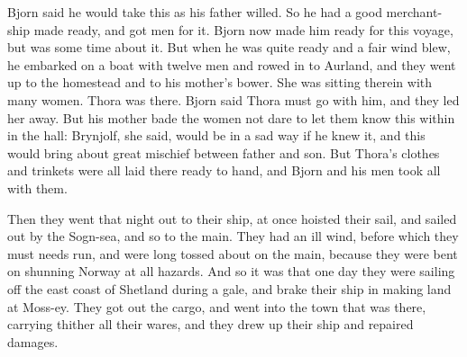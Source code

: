 Bjorn said he would take this as his father willed. So he had a good merchant-ship made ready, and got men for it. Bjorn now made him ready for this voyage, but was some time about it. But when he was quite ready and a fair wind blew, he embarked on a boat with twelve men and rowed in to Aurland, and they went up to the homestead and to his mother's bower. She was sitting therein with many women. Thora was there. Bjorn said Thora must go with him, and they led her away. But his mother bade the women not dare to let them know this within in the hall: Brynjolf, she said, would be in a sad way if he knew it, and this would bring about great mischief between father and son. But Thora's clothes and trinkets were all laid there ready to hand, and Bjorn and his men took all with them.

Then they went that night out to their ship, at once hoisted their sail, and sailed out by the Sogn-sea, and so to the main. They had an ill wind, before which they must needs run, and were long tossed about on the main, because they were bent on shunning Norway at all hazards. And so it was that one day they were sailing off the east coast of Shetland during a gale, and brake their ship in making land at Moss-ey. They got out the cargo, and went into the town that was there, carrying thither all their wares, and they drew up their ship and repaired damages.
